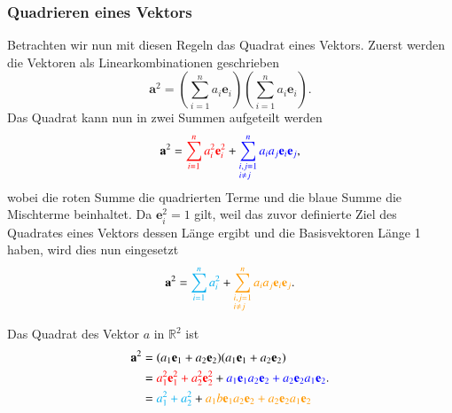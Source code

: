 \subsubsection{Quadrieren eines Vektors}
Betrachten wir nun mit diesen Regeln das Quadrat eines Vektors. Zuerst werden die Vektoren als Linearkombinationen geschrieben
\begin{equation}
	    \textbf{a}^2 = 
		\left ( 
		\sum_{i=1}^{n} a_i \textbf{e}_i 
		\right ) 
		\left ( 
		\sum_{i=1}^{n} a_i \textbf{e}_i 
		\right )
		\label{eq:quad_a_1}.
\end{equation}
Das Quadrat kann nun in zwei Summen aufgeteilt werden
\begin{equation}
	\textbf{a}^2 =
	\textcolor{red}{\sum_{i=1}^{n} a_i^2\textbf{e}_i^2} 
	+ 
	\textcolor{blue}{\sum_{\begin{subarray}{l}i,j=1\\i \neq j\end{subarray}}^n  a_ia_j\textbf{e}_i\textbf{e}_j } 
	\label{eq:quad_a_2},
\end{equation}
wobei die roten Summe die quadrierten Terme und die blaue Summe die Mischterme beinhaltet. Da $\textbf{e}_i^2 = 1$ gilt, weil das zuvor definierte Ziel des Quadrates eines Vektors dessen Länge ergibt und die Basisvektoren Länge 1 haben, wird dies nun eingesetzt
\begin{equation}
	\textbf{a}^2 = \textcolor{cyan}{\sum_{i=1}^{n} a_i^2} + \textcolor{orange}{\sum_{\begin{subarray}{l}i,j=1\\i \neq j\end{subarray}}^n  a_ia_j\textbf{e}_i\textbf{e}_j}.
	\label{eq:quad_a_3}
\end{equation}
\begin{beispiel}
Das Quadrat des Vektor $a$ in $\mathbb{R}^2$ ist
\begin{equation}
    \begin{split}
    \textbf{a}^2 
    &= (a_1\textbf{e}_1+a_2\textbf{e}_2)(a_1\textbf{e}_1+a_2\textbf{e}_2) \\\
    &= \textcolor{red}{a_1^2\textbf{e}_1^2 + a_2^2\textbf{e}_2^2} 
    + \textcolor{blue}{a_1\textbf{e}_1a_2\textbf{e}_2 + a_2\textbf{e}_2a_1\textbf{e}_2}   \\\
    & = \textcolor{cyan}{a_1^2 + a_2^2} + \textcolor{orange}{a_1b\textbf{e}_1a_2\textbf{e}_2 + a_2\textbf{e}_2a_1\textbf{e}_2}
    \end{split}.
\end{equation}
\end{beispiel}


